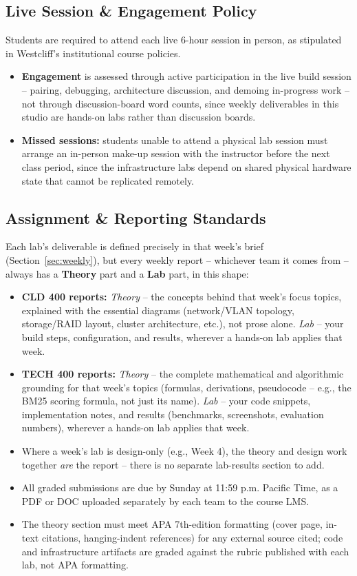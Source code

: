 \documentclass[10pt, a4paper]{article}
\begin{document}
\subsection*{Live Session \& Engagement Policy}
Students are required to attend each live 6-hour session in person, as stipulated in Westcliff's institutional course policies.
\begin{itemize}
    \item \textbf{Engagement} is assessed through active participation in the live build session -- pairing, debugging, architecture discussion, and demoing in-progress work -- not through discussion-board word counts, since weekly deliverables in this studio are hands-on labs rather than discussion boards.
    \item \textbf{Missed sessions:} students unable to attend a physical lab session must arrange an in-person make-up session with the instructor before the next class period, since the infrastructure labs depend on shared physical hardware state that cannot be replicated remotely.
\end{itemize}

\subsection*{Assignment \& Reporting Standards}
\label{sec:reporting}
Each lab's deliverable is defined precisely in that week's brief (Section~\ref{sec:weekly}), but every weekly report -- whichever team it comes from -- always has a \textbf{Theory} part and a \textbf{Lab} part, in this shape:
\begin{itemize}
    \item \textbf{CLD 400 reports:} \emph{Theory} -- the concepts behind that week's focus topics, explained with the essential diagrams (network/VLAN topology, storage/RAID layout, cluster architecture, etc.), not prose alone. \emph{Lab} -- your build steps, configuration, and results, wherever a hands-on lab applies that week.
    \item \textbf{TECH 400 reports:} \emph{Theory} -- the complete mathematical and algorithmic grounding for that week's topics (formulas, derivations, pseudocode -- e.g., the BM25 scoring formula, not just its name). \emph{Lab} -- your code snippets, implementation notes, and results (benchmarks, screenshots, evaluation numbers), wherever a hands-on lab applies that week.
    \item Where a week's lab is design-only (e.g., Week 4), the theory and design work together \emph{are} the report -- there is no separate lab-results section to add.
    \item All graded submissions are due by Sunday at 11:59 p.m. Pacific Time, as a PDF or DOC uploaded separately by each team to the course LMS.
    \item The theory section must meet APA 7th-edition formatting (cover page, in-text citations, hanging-indent references) for any external source cited; code and infrastructure artifacts are graded against the rubric published with each lab, not APA formatting.
\end{itemize}
\end{document}
